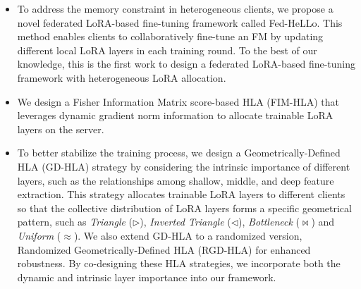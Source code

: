 \documentclass[lettersize,journal]{IEEEtran}
\newcommand{\ping}[1]{\textcolor{magenta}{#1}}
\begin{document}
\begin{itemize}
\item {To address the memory constraint in heterogeneous clients, we propose a novel federated LoRA-based fine-tuning framework called Fed-HeLLo.} 
This method enables clients to collaboratively fine-tune an FM by updating different local LoRA layers in each training round. 
To the best of our knowledge, this is the first work to design a federated LoRA-based fine-tuning framework with heterogeneous LoRA allocation. 



\item We design a Fisher Information Matrix score-based HLA (FIM-HLA) that leverages dynamic gradient norm information to allocate trainable LoRA layers on the server.

\item To better stabilize the training process, we design a Geometrically-Defined HLA (GD-HLA) strategy by considering the intrinsic importance of different layers, such as the relationships among shallow, middle, and deep feature extraction. This strategy allocates trainable LoRA layers to different clients so that the collective distribution of LoRA layers forms a specific geometrical pattern, such as \textit{Triangle} ($\rhd$), \textit{Inverted Triangle} ($\lhd$), \textit{Bottleneck} ($\bowtie$) and \textit{Uniform} ($\approx$). We also extend GD-HLA to a randomized version, Randomized Geometrically-Defined HLA (RGD-HLA) for enhanced robustness. By co-designing these HLA strategies, we incorporate both the dynamic and intrinsic layer importance into our framework. 


\end{itemize}
\end{document}
